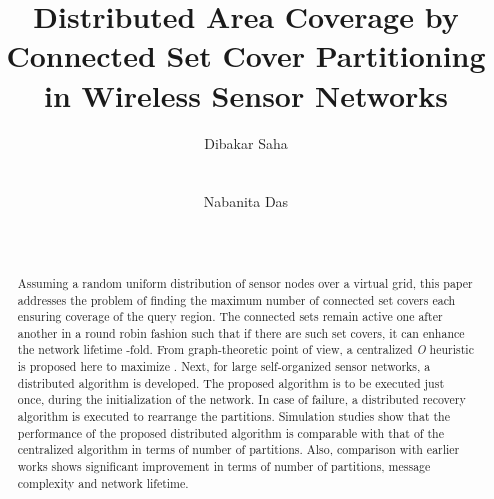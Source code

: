 \documentclass{acm_proc_article-sp}
\begin{document}
\title{Distributed Area Coverage by Connected Set Cover Partitioning in Wireless Sensor Networks}
\author{
\alignauthor
Dibakar Saha \\
      \\
       \\
\alignauthor
Nabanita Das \\
       \\
     \\
       }
     
\maketitle

\begin{abstract}
Assuming a random uniform distribution of  sensor nodes over a virtual grid, this paper addresses the problem of finding the maximum number of
connected set covers each ensuring  coverage of the query region. The connected sets remain active one after another in a round robin fashion such that if there are  such set covers, it can enhance the network lifetime
-fold. From graph-theoretic point of view, a centralized {\it O} heuristic is proposed here to maximize . Next, for large self-organized sensor networks, a distributed algorithm is developed. The proposed algorithm is to be executed just once, during the initialization of the network. In case of failure, a distributed recovery algorithm is executed to rearrange the partitions. Simulation studies show that the performance of the proposed distributed algorithm is comparable with that of the centralized algorithm in terms of number of partitions. Also, comparison with earlier works shows significant improvement in terms of number of partitions, message complexity and network lifetime. 

\end{abstract}
\end{document}
